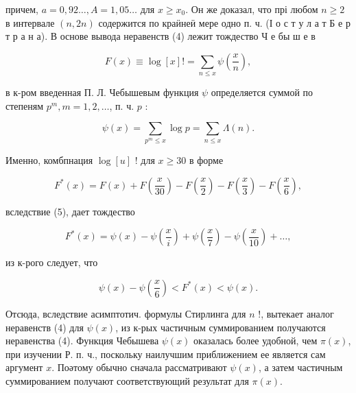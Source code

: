 \documentclass[10pt]{article}
\begin{document}
причем, $a=0,92 \ldots, A=1,05 \ldots$ для $x \geqslant x_{0}$. Он же доказал, что прі любом $n \geqslant 2$ в интервале $(n, 2 n)$ содержится по краӥнеӥ мере одно п. ч. (І о с т у л а т Б е р т р а н а). В основе вывода неравенств (4) лежит тождество Ч е бы ш е в



\[

F(x) \equiv \log [x] !=\sum_{n \leqslant x} \psi\left(\frac{x}{n}\right),

\]



в к-ром введенная П. Л. Чебышевым функция $\psi$ определяется суммой по степеням $p^{m}, m=1,2, \ldots$, п. ч. $p$ :



\[

\psi(x)=\sum_{p^{m} \leqslant x} \log p=\sum_{n \leqslant x} \Lambda(n) .

\]



Именно, комбпнация $\log [u]$ ! для $x \geqslant 30$ в форме



\[

F^{*}(x)=F(x)+F\left(\frac{x}{30}\right)-F\left(\frac{x}{2}\right)-F\left(\frac{x}{3}\right)-F\left(\frac{x}{6}\right),

\]



вследствие (5), дает тождество



\[

F^{*}(x)=\psi(x)-\psi\left(\frac{x}{i}\right)+\psi\left(\frac{x}{7}\right)-\psi\left(\frac{x}{10}\right)+\ldots,

\]



из к-рого следует, что



\[

\psi(x)-\psi\left(\frac{x}{6}\right)<F^{*}(x)<\psi(x) .

\]



Отсюда, вследствие асимптотич. формулы Стирлинга для $n$ !, вытекает аналог неравенств (4) для $\psi(x)$, из к-рых частичным суммированием получаются неравенства (4). Функция Чебышева $\psi(x)$ оказалась более удобной, чем $\pi(x)$, при изучении Р. п. ч., поскольку наилучшим приближением ее является сам аргумент $x$. Поәтому обычно сначала рассматривают $\psi(x)$, а затем частичным суммированием получают соответствующий результат для $\pi(x)$.
\end{document}

